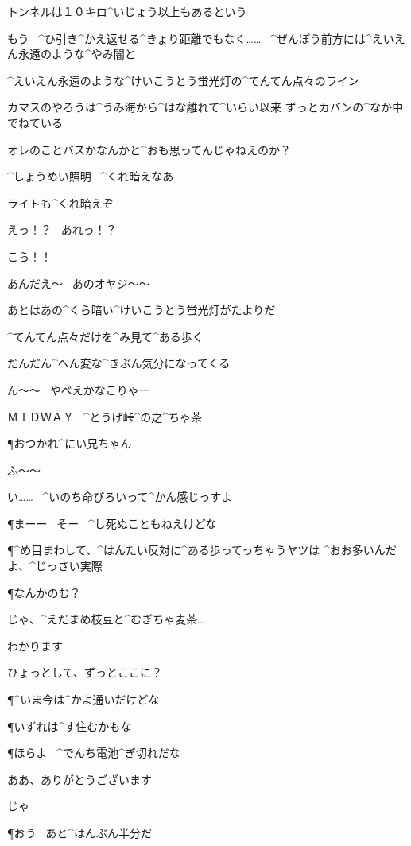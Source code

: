 \Y トンネルは１０キロ^{いじょう}{以上}もあるという

\Y もう
\ ^{ひ}{引}き^{かえ}{返}せる^{きょり}{距離}でもなく……
\ ^{ぜんぽう}{前方}には^{えいえん}{永遠}のような^{やみ}{闇}と

\Y ^{えいえん}{永遠}のような^{けいこうとう}{蛍光灯}の^{てんてん}{点々}のライン

\page
\Y カマスのやろうは^{うみ}{海}から^{はな}{離}れて^{いらい}{以来}
ずっとカバンの^{なか}{中}でねている

\Y オレのことバスかなんかと^{おも}{思}ってんじゃねえのか？

\Y ^{しょうめい}{照明}
\ ^{くれ}{暗}えなあ

\page
\Y ライトも^{くれ}{暗}えぞ

\Y えっ！？
\ あれっ！？

\Y こら！！

\Y あんだえ〜
\ あのオヤジ〜〜

\page
\Y あとはあの^{くら}{暗}い^{けいこうとう}{蛍光灯}がたよりだ

\Y ^{てんてん}{点々}だけを^{み}{見}て^{ある}{歩}く

\Y だんだん^{へん}{変}な^{きぶん}{気分}になってくる

\Y ん〜〜
\ やべえかなこりゃー

\page[115]
\Sign ＭＩＤＷＡＹ
\ ^{とうげ}{峠}^{の}{之}^{ちゃ}{茶}

\P おつかれ^{にい}{兄}ちゃん

\Y ふ〜〜

\Y い……
\ ^{いのち}{命}びろいって^{かん}{感}じっすよ

\P まーー
\ そー
\ ^{し}{死}ぬこともねえけどな

\P ^{め}{目}まわして、^{はんたい}{反対}に^{ある}{歩}ってっちゃうヤツは
^{おお}{多}いんだよ、^{じっさい}{実際}

\P なんかのむ？

\Y じゃ、^{えだまめ}{枝豆}と^{むぎちゃ}{麦茶}…

\Y わかります

\page
\Y ひょっとして、ずっとここに？

\P ^{いま}{今}は^{かよ}{通}いだけどな

\P いずれは^{す}{住}むかもな

\P ほらよ
\ ^{でんち}{電池}^{ぎ}{切}れだな

\Y ああ、ありがとうございます

\page
\Y じゃ

\P おう
\ あと^{はんぶん}{半分}だ

